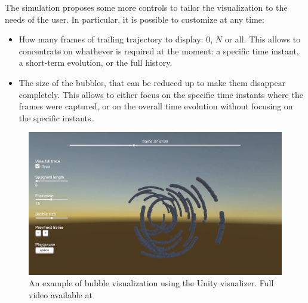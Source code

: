 The simulation proposes some more controls to tailor the visualization to the needs of the user.
In particular, it is possible to customize at any time:
\begin{itemize}
	\itemsep 0em
	\item How many frames of trailing trajectory to display: 0, $N$ or all. This allows to concentrate on whathever is required at the moment: a specific time instant, a short-term evolution, or the full history.
	\item The size of the bubbles, that can be reduced up to make them disappear completely. This allows to either focus on the specific time instants where the frames were captured, or on the overall time evolution without focusing on the specific instants.
\end{itemize}

\begin{figure}[H]
	\centerline{\includegraphics[width=\locateimgsize]{images/visual/unity.png}}
	\caption{\centering An example of bubble visualization using the Unity visualizer. Full video available at~\cite{visual-unity}}
	\label{fig:visual:unity}
\end{figure}

